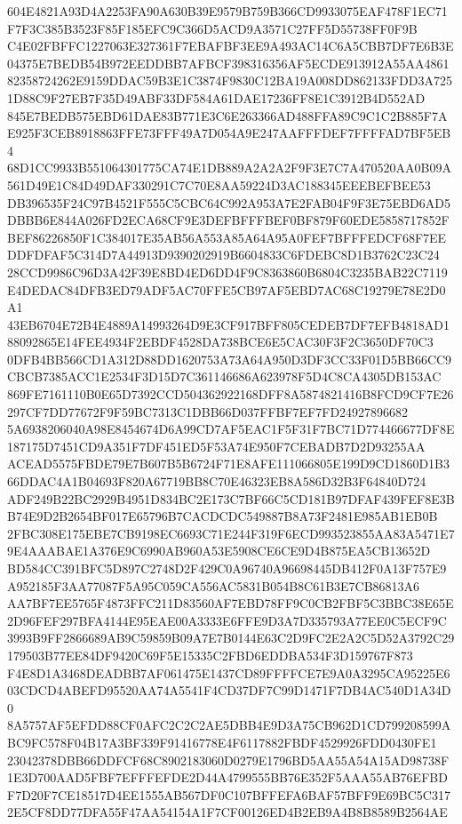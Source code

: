 \documentclass[UTF8,fontset=fandol,zihao=-4,a4paper]{ctexart}
\begin{document}
{{604E4821A93D4A2253FA90A630B39E9579B759B366CD9933075EAF478F1EC71F7F3C385B3523F85F185EFC9C366D5ACD9A3571C27FF5D55738FF0F9B
C4E02FBFFC1227063E327361F7EBAFBF3EE9A493AC14C6A5CBB7DF7E6B3E04375E7BEDB54B972EEDDBB7AFBCF398316356AF5ECDE913912A55AA4861
82358724262E9159DDAC59B3E1C3874F9830C12BA19A008DD862133FDD3A7251D88C9F27EB7F35D49ABF33DF584A61DAE17236FF8E1C3912B4D552AD
845E7BEDB575EBD61DAE83B771E3C6E263366AD488FFA89C9C1C2B885F7AE925F3CEB8918863FFE73FFF49A7D054A9E247AAFFFDEF7FFFFAD7BF5EB4
68D1CC9933B551064301775CA74E1DB889A2A2A2F9F3E7C7A470520AA0B09A561D49E1C84D49DAF330291C7C70E8AA59224D3AC188345EEEBEFBEE53
DB396535F24C97B4521F555C5CBC64C992A953A7E2FAB04F9F3E75EBD6AD5DBBB6E844A026FD2ECA68CF9E3DEFBFFFBEF0BF879F60EDE5858717852F
BEF86226850F1C384017E35AB56A553A85A64A95A0FEF7BFFFEDCF68F7EEDDFDFAF5C314D7A44913D9390202919B6604833C6FDEBC8D1B3762C23C24
28CCD9986C96D3A42F39E8BD4ED6DD4F9C8363860B6804C3235BAB22C7119E4DEDAC84DFB3ED79ADF5AC70FFE5CB97AF5EBD7AC68C19279E78E2D0A1
43EB6704E72B4E4889A14993264D9E3CF917BFF805CEDEB7DF7EFB4818AD188092865E14FEE4934F2EBDF4528DA738BCE6E5CAC30F3F2C3650DF70C3
0DFB4BB566CD1A312D88DD1620753A73A64A950D3DF3CC33F01D5BB66CC9CBCB7385ACC1E2534F3D15D7C361146686A623978F5D4C8CA4305DB153AC
869FE7161110B0E65D7392CCD504362922168DFF8A5874821416B8FCD9CF7E26297CF7DD77672F9F59BC7313C1DBB66D037FFBF7EF7FD24927896682
5A6938206040A98E8454674D6A99CD7AF5EAC1F5F31F7BC71D774466677DF8E187175D7451CD9A351F7DF451ED5F53A74E950F7CEBADB7D2D93255AA
ACEAD5575FBDE79E7B607B5B6724F71E8AFE111066805E199D9CD1860D1B366DDAC4A1B04693F820A67719BB8C70E46323EB8A586D32B3F64840D724
ADF249B22BC2929B4951D834BC2E173C7BF66C5CD181B97DFAF439FEF8E3BB74E9D2B2654BF017E65796B7CACDCDC549887B8A73F2481E985AB1EB0B
2FBC308E175EBE7CB9198EC6693C71E244F319F6ECD993523855AA83A5471E79E4AAABAE1A376E9C6990AB960A53E5908CE6CE9D4B875EA5CB13652D
BD584CC391BFC5D897C2748D2F429C0A96740A96698445DB412F0A13F757E9A952185F3AA77087F5A95C059CA556AC5831B054B8C61B3E7CB86813A6
AA7BF7EE5765F4873FFC211D83560AF7EBD78FF9C0CB2FBF5C3BBC38E65E2D96FEF297BFA4144E95EAE00A3333E6FFE9D3A7D335793A77EE0C5ECF9C
3993B9FF2866689AB9C59859B09A7E7B0144E63C2D9FC2E2A2C5D52A3792C29179503B77EE84DF9420C69F5E15335C2FBD6EDDBA534F3D159767F873
F4E8D1A3468DEADBB7AF061475E1437CD89FFFFCE7E9A0A3295CA95225E603CDCD4ABEFD95520AA74A5541F4CD37DF7C99D1471F7DB4AC540D1A34D0
8A5757AF5EFDD88CF0AFC2C2C2AE5DBB4E9D3A75CB962D1CD799208599ABC9FC578F04B17A3BF339F91416778E4F6117882FBDF4529926FDD0430FE1
23042378DBB66DDFCF68C8902183060D0279E1796BD5AA55A54A15AD98738F1E3D700AAD5FBF7EFFFEFDE2D44A4799555BB76E352F5AAA55AB76EFBD
F7D20F7CE18517D4EE1555AB567DF0C107BFFEFA6BAF57BFF9E69BC5C3172E5CF8DD77DFA55F47AA54154A1F7CF00126ED4B2EB9A4B8B8589B2564AE
}}
\end{document}
